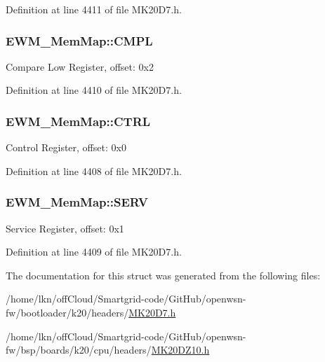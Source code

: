 Definition at line 4411 of file M\+K20\+D7.\+h.

\subsubsection[{\texorpdfstring{C\+M\+PL}{CMPL}}]{ E\+W\+M\+\_\+\+Mem\+Map\+::\+C\+M\+PL}\hypertarget{struct_e_w_m___mem_map_ada0221f7554297f23a0257f54f28f5fc}{}\label{struct_e_w_m___mem_map_ada0221f7554297f23a0257f54f28f5fc}
Compare Low Register, offset\+: 0x2 

Definition at line 4410 of file M\+K20\+D7.\+h.

\subsubsection[{\texorpdfstring{C\+T\+RL}{CTRL}}]{ E\+W\+M\+\_\+\+Mem\+Map\+::\+C\+T\+RL}\hypertarget{struct_e_w_m___mem_map_a033a88d44ad1daa23ce3deb13bc94811}{}\label{struct_e_w_m___mem_map_a033a88d44ad1daa23ce3deb13bc94811}
Control Register, offset\+: 0x0 

Definition at line 4408 of file M\+K20\+D7.\+h.

\subsubsection[{\texorpdfstring{S\+E\+RV}{SERV}}]{ E\+W\+M\+\_\+\+Mem\+Map\+::\+S\+E\+RV}\hypertarget{struct_e_w_m___mem_map_aa9c25d4775f785d6911e096a226f4e40}{}\label{struct_e_w_m___mem_map_aa9c25d4775f785d6911e096a226f4e40}
Service Register, offset\+: 0x1 

Definition at line 4409 of file M\+K20\+D7.\+h.



The documentation for this struct was generated from the following files\+:\begin{DoxyCompactItemize}
\item 
/home/lkn/off\+Cloud/\+Smartgrid-\/code/\+Git\+Hub/openwsn-\/fw/bootloader/k20/headers/\hyperlink{bootloader_2k20_2headers_2_m_k20_d7_8h}{M\+K20\+D7.\+h}\item 
/home/lkn/off\+Cloud/\+Smartgrid-\/code/\+Git\+Hub/openwsn-\/fw/bsp/boards/k20/cpu/headers/\hyperlink{_m_k20_d_z10_8h}{M\+K20\+D\+Z10.\+h}\end{DoxyCompactItemize}
